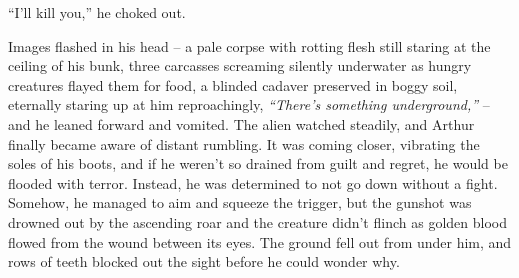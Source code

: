 “I’ll kill you,” he choked out. 

Images flashed in his head – a pale corpse with rotting flesh still staring at the ceiling of his bunk, three carcasses screaming silently underwater as hungry creatures flayed them for food, a blinded cadaver preserved in boggy soil, eternally staring up at him reproachingly, \textit{“There’s something underground,”} – and he leaned forward and vomited. The alien watched steadily, and Arthur finally became aware of distant rumbling. It was coming closer, vibrating the soles of his boots, and if he weren’t so drained from guilt and regret, he would be flooded with terror. Instead, he was determined to not go down without a fight. Somehow, he managed to aim and squeeze the trigger, but the gunshot was drowned out by the ascending roar and the creature didn’t flinch as golden blood flowed from the wound between its eyes. The ground fell out from under him, and rows of teeth blocked out the sight before he could wonder why. 